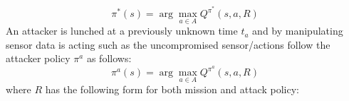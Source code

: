 \documentclass[letterpaper, 10 pt, conference]{ieeeconf}  %
\newtheorem{problem}{Problem}
\newcommand\NB[1]{$\spadesuit$\footnote{NB: #1}}
\begin{document}
\begin{equation}
\pi^*(s) = \arg\!\max_{a\in A} Q^{\pi^*}(s,a,R)
\label{eq:pistar}
\end{equation}
An attacker is lunched at a previously unknown time $t_a$ and by manipulating sensor data is acting such as the uncompromised sensor/actions follow the attacker policy $\pi^a$ as follows:
\begin{equation}
\pi^a(s) = \arg\!\max_{a\in A} Q^{\pi^a}(s,a,R)
\end{equation}
where $R$ has the following form for both mission and attack policy:
%
\end{document}
